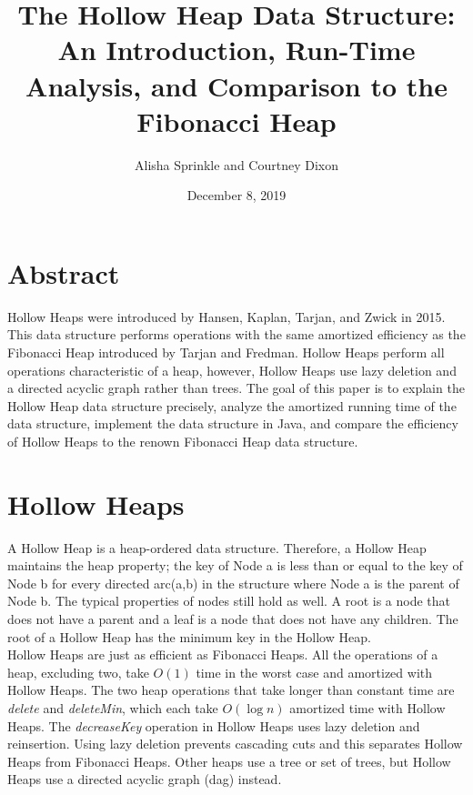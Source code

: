 \documentclass[letter,10pt]{article}
\begin{document}
\title{The Hollow Heap Data Structure: An Introduction, Run-Time Analysis, and Comparison to the Fibonacci Heap}
\author{Alisha Sprinkle and Courtney Dixon}
\date{December 8, 2019}
\maketitle

\section{Abstract}
\quad Hollow Heaps were introduced by Hansen, Kaplan, Tarjan, and Zwick in 2015. This data structure performs operations with the same amortized efficiency as the Fibonacci Heap introduced by Tarjan and Fredman. Hollow Heaps perform all operations characteristic of a heap, however, Hollow Heaps use lazy deletion and a directed acyclic graph rather than trees. The goal of this paper is to explain the Hollow Heap data structure precisely, analyze the amortized running time of the data structure, implement the data structure in Java, and compare the efficiency of Hollow Heaps to the renown Fibonacci Heap data structure.

\section{Hollow Heaps}
\quad A Hollow Heap is a heap-ordered data structure. Therefore, a Hollow Heap maintains the heap property; the key of Node a is less than or equal to the key of Node b for every directed arc(a,b) in the structure where Node a is the parent of Node b. The typical properties of nodes still hold as well. A root is a node that does not have a parent and a leaf is a node that does not have any children. The root of a Hollow Heap has the minimum key in the Hollow Heap.\\

Hollow Heaps are just as efficient as Fibonacci Heaps. All the operations of a heap, excluding two, take $O(1)$ time in the worst case and amortized with Hollow Heaps. The two heap operations that take longer than constant time are \textit{delete} and \textit{deleteMin}, which each take $O(\log n)$ amortized time with Hollow Heaps. The \textit{decreaseKey} operation in Hollow Heaps uses lazy deletion and reinsertion. Using lazy deletion prevents cascading cuts and this separates Hollow Heaps from Fibonacci Heaps. Other heaps use a tree or set of trees, but Hollow Heaps use a directed acyclic graph (dag) instead.\\
\end{document}
